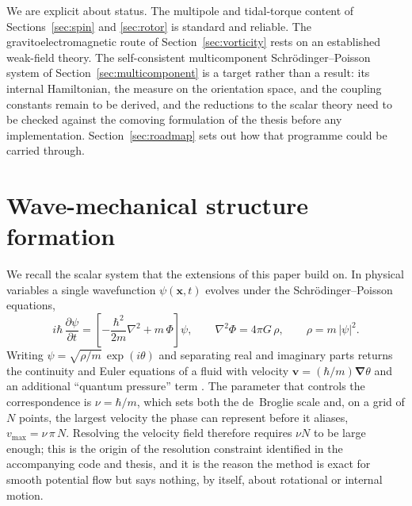 \documentclass[11pt,a4paper]{article}
\newcommand{\grad}{\bm{\nabla}}
\begin{document}
We are explicit about status. The multipole and tidal-torque content of
Sections~\ref{sec:spin} and \ref{sec:rotor} is standard and reliable. The
gravitoelectromagnetic route of Section~\ref{sec:vorticity} rests on an established
weak-field theory. The self-consistent multicomponent Schr\"odinger--Poisson system of
Section~\ref{sec:multicomponent} is a target rather than a result: its internal
Hamiltonian, the measure on the orientation space, and the coupling constants remain to
be derived, and the reductions to the scalar theory need to be checked against the
comoving formulation of the thesis before any implementation. Section~\ref{sec:roadmap}
sets out how that programme could be carried through.

\section{Wave-mechanical structure formation}
\label{sec:background}

We recall the scalar system that the extensions of this paper build on. In physical
variables a single wavefunction $\psi(\mathbf{x},t)$ evolves under the
Schr\"odinger--Poisson equations,
%
\begin{equation}
  i\hbar\,\frac{\partial \psi}{\partial t}
  = \left[ -\frac{\hbar^2}{2m}\nabla^2 + m\,\Phi \right]\psi,
  \qquad
  \nabla^2 \Phi = 4\pi G\,\rho, \qquad \rho = m\,|\psi|^2 .
  \label{eq:sp-physical}
\end{equation}
%
Writing $\psi = \sqrt{\rho/m}\,\exp(i\theta)$ and separating real and imaginary parts
returns the continuity and Euler equations of a fluid with velocity
$\mathbf{v} = (\hbar/m)\grad\theta$ and an additional ``quantum pressure'' term
\citep{madelung1927}. The parameter that controls the correspondence is
$\nu = \hbar/m$, which sets both the de~Broglie scale and, on a grid of $N$ points, the
largest velocity the phase can represent before it aliases,
$v_{\max} = \nu\,\pi\,N$. Resolving the velocity field therefore requires $\nu N$ to be
large enough; this is the origin of the resolution constraint identified in the
accompanying code and thesis, and it is the reason the method is exact for smooth
potential flow but says nothing, by itself, about rotational or internal motion.
\end{document}

